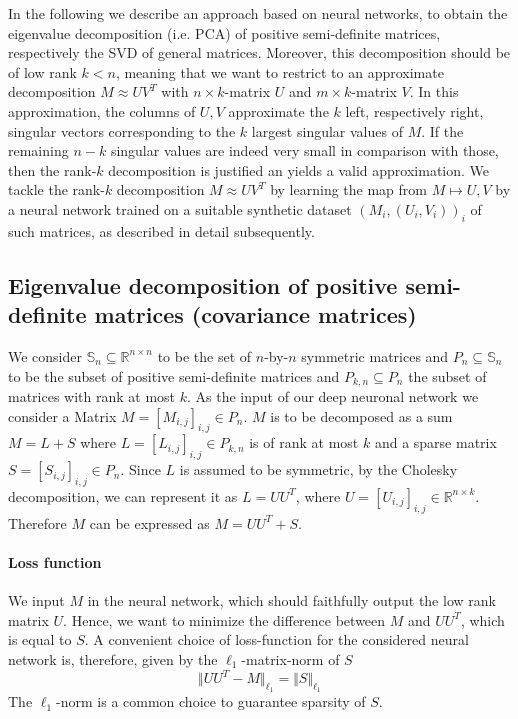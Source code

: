 In the following we describe an approach based on neural networks, to obtain the eigenvalue decomposition (i.e. PCA) of positive semi-definite matrices, respectively the SVD of general matrices. Moreover, this decomposition should be of low rank $k<n$, meaning that we want to restrict to an approximate decomposition $M \approx UV^T$ with $n\times k$-matrix $U$ and $m\times k$-matrix $V$. In this approximation, the columns of $U,V$ approximate the $k$ left, respectively right, singular vectors corresponding to the $k$ largest singular values of $M$. If the remaining $n-k$ singular values are indeed very small in comparison with those, then the rank-$k$ decomposition is justified an yields a valid approximation. We tackle the rank-$k$ decomposition $M \approx UV^T$ by learning the map from $M \mapsto U,V$ by a neural network trained on a suitable synthetic dataset $(M_i,(U_i,V_i))_i$ of such matrices, as described in detail subsequently. 



\subsection{Eigenvalue decomposition of positive semi-definite matrices (covariance matrices)}
 
We consider $\mathbb{S}_n \subseteq \mathbb{R}^{n \times n}$ to be the set of $n$-by-$n$ symmetric matrices and $P_n\subseteq \mathbb{S}_n$ to be the subset of positive semi-definite matrices and $P_{k,n} \subseteq P_n$ the subset of matrices with rank at most $k$. As the input of our deep neuronal network we consider a Matrix $M = [M_{i,j}]_{i,j} \in P_n$. $M$ is to be decomposed as a sum $M = L + S$ where $L = [L_{i,j}]_{i,j} \in P_{k,n}$ is of rank at most $k$ and a sparse matrix $S = [S_{i,j}]_{i,j} \in P_n$. Since $L$ is assumed to be symmetric, by the Cholesky decomposition, we can represent it as $L=UU^T$, where $U = [U_{i,j}]_{i,j} \in \mathbb{R}^{n \times k}$. Therefore $M$ can be expressed as $M = UU^T + S$.

\paragraph{Loss function}
We input $M$ in the neural network, which should faithfully output the low rank matrix $U$. Hence, we want to minimize the difference between $M$ and $UU^T$, which is equal to $S$. A convenient choice of loss-function for the considered neural network is, therefore, given by the $\ell_1$-matrix-norm of $S$
\[
\Vert UU^T - M \Vert_{\ell_1} = \Vert S \Vert_{\ell_1}
\]
The $\ell_1$-norm is a common choice to guarantee sparsity of $S$.

